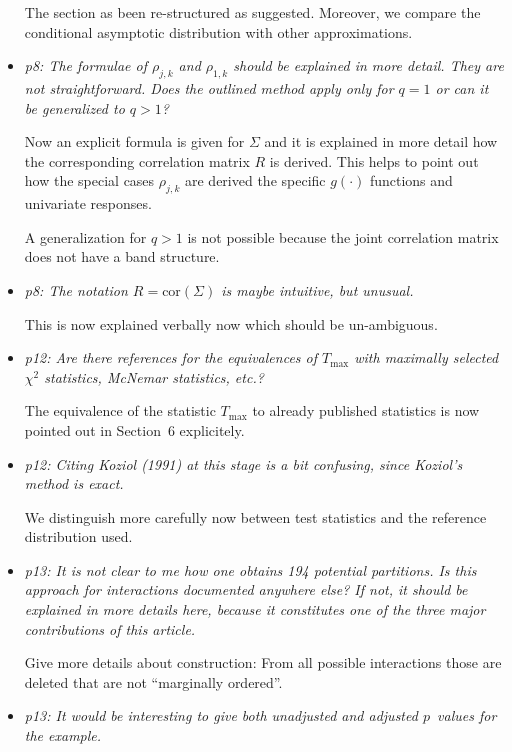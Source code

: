 \documentclass[11pt,a4paper]{article}
\begin{document}
\begin{itemize}
	The section as been re-structured as suggested. Moreover, 
        we compare the conditional asymptotic distribution with
        other approximations.
	
  \item \textit{p8: The formulae of $\rho_{j,k}$ and $\rho_{1,k}$ should be
        explained in more detail. They are not straightforward. Does the outlined
	method apply only for $q = 1$ or can it be generalized to $q > 1$?}
	
	Now an explicit formula is given for $\Sigma$ and it is explained in more
	detail how the corresponding correlation matrix $R$ is derived. This
	helps to point out how the special cases $\rho_{j, k}$ are
	derived the specific $g(\cdot)$ functions and univariate responses.
	
	A generalization for $q > 1$ is not possible because the joint correlation
	matrix does not have a band structure.
	
  \item \textit{p8: The notation $R = \mbox{cor}(\Sigma)$ is maybe intuitive, but unusual.}
  
        This is now explained verbally now which should be un-ambiguous.
	
  \item \textit{p12: Are there references for the equivalences of $T_{\max}$ with maximally
        selected $\chi^2$ statistics, McNemar statistics, etc.?}
	
	The equivalence of the statistic $T_\text{max}$ to already published
        statistics is now pointed out in Section~6 explicitely.
	
  \item \textit{p12: Citing Koziol (1991) at this stage is a bit confusing, since
        Koziol's method is exact.}
	
	We distinguish more carefully now between test statistics and the reference
	distribution used.
	
  \item \textit{p13: It is not clear to me how one obtains 194 potential partitions.
        Is this approach for interactions documented anywhere else? If not, it should be
        explained in more details here, because it constitutes one of the three major
        contributions of this article.}
	
	Give more details about construction: From all possible interactions those are
	deleted that are not ``marginally ordered''.
	
  \item \textit{p13: It would be interesting to give both unadjusted and adjusted $p$~values
        for the example.}
	

\end{itemize}
\end{document}
